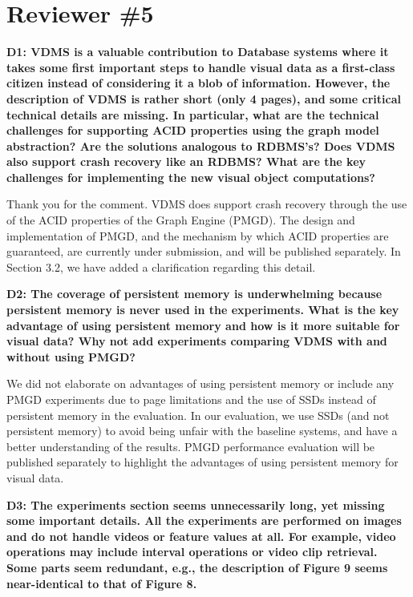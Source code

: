 \documentclass[11pt]{proposalnsf}
\begin{document}
\section{Reviewer \#5}

\noindent %
\textbf{
D1: VDMS is a valuable contribution to Database systems where it takes
some first important steps to handle visual data as a first-class citizen
instead of considering it a blob of information. However, the description
of VDMS is rather short (only 4 pages), and some critical technical
details are missing. In particular, what are the technical challenges
for supporting ACID properties using the graph model abstraction? Are
the solutions analogous to RDBMS’s? Does VDMS also support crash
recovery like an RDBMS? What are the key challenges for implementing
the new visual object computations?
}\bigskip

Thank you for the comment.
VDMS does support crash recovery through the use of the ACID properties
of the Graph Engine (PMGD).
The design and implementation of PMGD, and the mechanism by which ACID properties
are guaranteed, are currently under submission, and will be published separately.
In Section 3.2, we have added a clarification regarding this detail.

\bigskip
\noindent %
\textbf{
D2: The coverage of persistent memory is underwhelming because persistent memory
is never used in the experiments.
What is the key advantage of using persistent memory and how is it
more suitable for visual data? Why not add experiments comparing VDMS with
and without using PMGD?
}\bigskip

We did not elaborate on advantages of using persistent memory or include
any PMGD experiments due to page limitations and the use of SSDs
instead of persistent memory in the evaluation.
In our evaluation, we use SSDs (and not persistent memory) to avoid
being unfair with the baseline systems, and have a better understanding of
the results.
PMGD performance evaluation will be published separately to highlight
the advantages of using persistent memory for visual data.

\bigskip
\noindent %
\textbf{
D3: The experiments section seems unnecessarily long, yet missing some important
details. All the experiments are performed on images and do not handle videos or feature
values at all. For example, video operations may include interval operations or video
clip retrieval. Some parts seem redundant, e.g., the description of Figure 9 seems
near-identical to that of Figure 8.
}\bigskip
\end{document}
